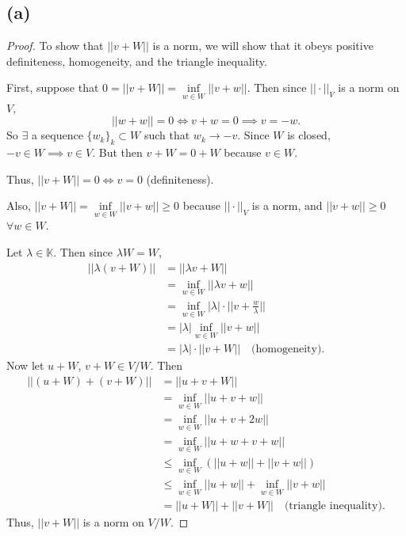 \documentclass{article}
\begin{document}
\subsection*{(a)}
\begin{proof}
	To show that $||v + W||$ is a norm, we will show that it obeys positive definiteness, homogeneity, and the triangle inequality.
	
	First, suppose that $0 = ||v+W|| = \inf\limits_{w\in W}||v + w||$. Then since $||\cdot||_{V}$ is a norm on $V$, 
	\begin{equation}
		||w+w|| = 0 \iff v + w = 0 \implies v = -w.
	\end{equation}
	So $\exists$ a sequence $\{w_k\}_k \subset W$ such that $w_k \rightarrow -v$. Since $W$ is closed, $-v\in W \implies v\in V$. But then $v+W = 0 + W$ because $v \in W$. 
	
	Thus, $||v + W|| = 0 \iff v = 0$ (definiteness).
	
	Also, $||v+W|| = \inf\limits_{w\in W}||v+w|| \geq 0$ because $||\cdot||_V$ is a norm, and $||v+w|| \geq 0$ $\forall w\in W$.
	
	Let $\lambda \in \mathbb{K}$. Then since $\lambda W = W$, 
	\begin{align}
		||\lambda (v + W)|| &= ||\lambda v + W|| \\
		&= \inf\limits_{w\in W} ||\lambda v + w|| \\
		&= \inf\limits_{w\in W} |\lambda| \cdot ||v + \frac{w}{\lambda}|| \\
		&= |\lambda|\inf\limits_{w\in W}||v+w|| \\
		&= |\lambda|\cdot||v+W|| \quad \textrm{(homogeneity)}.
	\end{align}
	Now let $u+W$, $v+W \in V/W$. Then
	\begin{align}
		||(u+W) + (v+W)|| &= ||u+v+W|| \\
		&= \inf\limits_{w\in W}||u+v+w|| \\
		&= \inf\limits_{w\in W}||u+v+2w|| \\
		&= \inf\limits_{w\in W}||u+w + v+w|| \\
		&\leq \inf\limits_{w\in W}\left(||u+w|| + ||v+w||\right)\\
		&\leq \inf\limits_{w\in W}||u+w|| + \inf\limits_{w\in W}||v+w||\\
		&= ||u+W|| + ||v+W|| \quad \textrm{(triangle inequality)}.
	\end{align}
	Thus, $||v+W||$ is a norm on $V/W$.
\end{proof}
\end{document}
